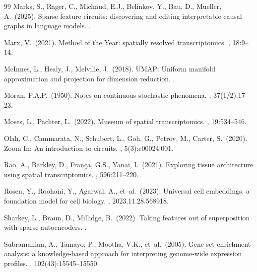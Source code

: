 \documentclass[11pt]{article}
\begin{document}
\begin{thebibliography}{99}
Marks, S., Rager, C., Michaud, E.J., Belinkov, Y., Bau, D., Mueller, A.\ (2025).
\newblock Sparse feature circuits: discovering and editing interpretable
  causal graphs in language models.
.

Marx, V.\ (2021).
\newblock Method of the Year: spatially resolved transcriptomics.
, 18:9--14.

McInnes, L., Healy, J., Melville, J.\ (2018).
\newblock UMAP: Uniform manifold approximation and projection for dimension
  reduction.
.


Moran, P.A.P.\ (1950).
\newblock Notes on continuous stochastic phenomena.
, 37(1/2):17--23.

Moses, L., Pachter, L.\ (2022).
\newblock Museum of spatial transcriptomics.
, 19:534--546.

Olah, C., Cammarata, N., Schubert, L., Goh, G., Petrov, M., Carter, S.\ (2020).
\newblock Zoom In: An introduction to circuits.
, 5(3):e00024.001.


Rao, A., Barkley, D., Fran\c{c}a, G.S., Yanai, I.\ (2021).
\newblock Exploring tissue architecture using spatial transcriptomics.
, 596:211--220.


Rosen, Y., Roohani, Y., Agarwal, A., et~al.\ (2023).
\newblock Universal cell embeddings: a foundation model for cell biology.
, 2023.11.28.568918.


Sharkey, L., Braun, D., Millidge, B.\ (2022).
\newblock Taking features out of superposition with sparse autoencoders.
.

Subramanian, A., Tamayo, P., Mootha, V.K., et~al.\ (2005).
\newblock Gene set enrichment analysis: a knowledge-based approach for
  interpreting genome-wide expression profiles.
, 102(43):15545--15550.


\end{thebibliography}
\end{document}
